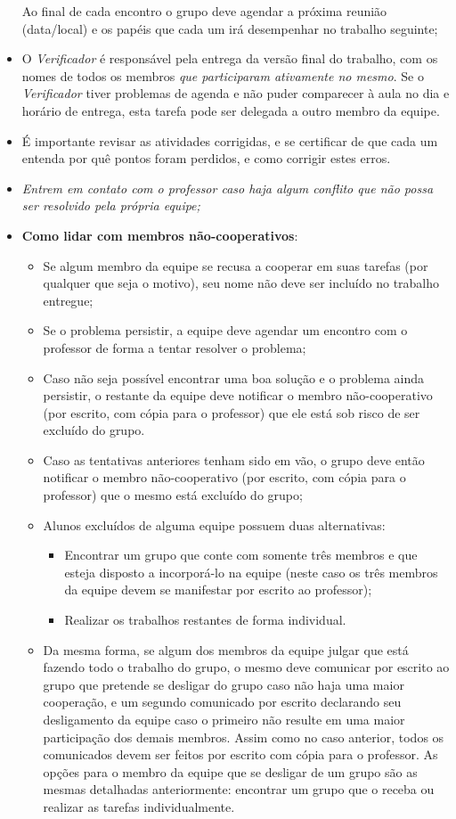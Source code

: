 \documentclass{letter}
\begin{document}
\begin{letter}{}
\begin{itemize}
Ao final de cada encontro o grupo deve agendar a próxima reunião (data/local) e os papéis que cada um irá desempenhar no trabalho seguinte;
\item O \textit{Verificador} é responsável pela entrega da versão final do trabalho, com os nomes de todos os membros \textit{que participaram ativamente no mesmo}. Se o \textit{Verificador} tiver problemas de agenda e não puder comparecer à aula no dia e horário de entrega, esta tarefa pode ser delegada a outro membro da equipe.
\item É importante revisar as atividades corrigidas, e se certificar de que cada um entenda por quê pontos foram perdidos, e como corrigir estes erros.
\item \textit{Entrem em contato com o professor caso haja algum conflito que não possa ser resolvido pela própria equipe;}
\item \textbf{Como lidar com membros não-cooperativos}: 
\begin{itemize}
\item Se algum membro da equipe se recusa a cooperar em suas tarefas (por qualquer que seja o motivo), seu nome não deve ser incluído no trabalho entregue;
\item Se o problema persistir, a equipe deve agendar um encontro com o professor de forma a tentar resolver o problema;
\item Caso não seja possível encontrar uma boa solução e o problema ainda persistir, o restante da equipe deve notificar o membro não-cooperativo (por escrito, com cópia para o professor) que ele está sob risco de ser excluído do grupo.
\item Caso as tentativas anteriores tenham sido em vão, o grupo deve então notificar o membro não-cooperativo (por escrito, com cópia para o professor) que o mesmo está excluído do grupo;
\item Alunos excluídos de alguma equipe possuem duas alternativas: 
\begin{itemize}
\item Encontrar um grupo que conte com somente três membros e que esteja disposto a incorporá-lo na equipe (neste caso os três membros da equipe devem se manifestar por escrito ao professor); 
\item Realizar os trabalhos restantes de forma individual.
\end{itemize}
\item Da mesma forma, se algum dos membros da equipe julgar que está fazendo todo o trabalho do grupo, o mesmo deve comunicar por escrito ao grupo que pretende se desligar do grupo caso não haja uma maior cooperação, e um segundo comunicado por escrito declarando seu desligamento da equipe caso o primeiro não resulte em uma maior participação dos demais membros. Assim como no caso anterior, todos os comunicados devem ser feitos por escrito com cópia para o professor. As opções para o membro da equipe que se desligar de um grupo são as mesmas detalhadas anteriormente: encontrar um grupo que o receba ou realizar as tarefas individualmente.
\end{itemize} 
\end{itemize}


\end{letter}
\end{document}
